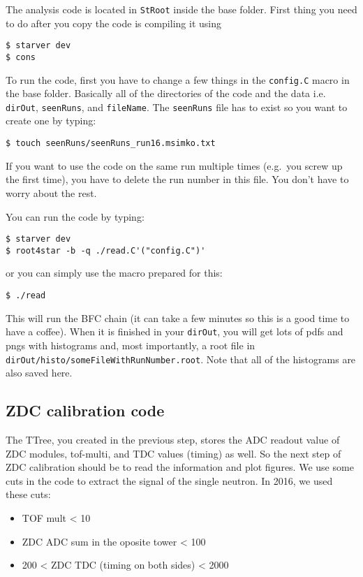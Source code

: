The analysis code is located in \texttt{StRoot} inside the base folder. First thing you need to do after you
copy the code is compiling it using
\begin{verbatim}
$ starver dev
$ cons
\end{verbatim}
To run the code, first you have to change a few things in the \texttt{config.C} macro in the base folder. 
Basically all of the
directories of the code and the data i.e. \texttt{dirOut}, \texttt{seenRuns}, and \texttt{fileName}. 
The \texttt{seenRuns} file has to
exist so you want to create one by typing:
\begin{verbatim}
$ touch seenRuns/seenRuns_run16.msimko.txt
\end{verbatim}
If you want to use the code
on the same run multiple times (e.g.\ you screw up the first time), you have to delete the run number in
this file. You don't have to worry
about the rest.

You can run the code by typing:
\begin{verbatim}
$ starver dev
$ root4star -b -q ./read.C'("config.C")'
\end{verbatim}
or you can simply use the macro prepared for this:
\begin{verbatim}
$ ./read
\end{verbatim}
This will run the BFC chain (it can take a few minutes so this is a good time to have a coffee). When it is finished
in your \texttt{dirOut}, you will get lots of pdfs and pngs with histograms and, most importantly, a root file in
\texttt{dirOut/histo/someFileWithRunNumber.root}. Note that all of the histograms are also saved here.

\subsection{ZDC calibration code}\hypertarget{zdc-calibration-code}{}\label{zdc-calibration-code}



The TTree, you created in the previous step, stores the ADC readout value of ZDC modules, tof-multi, and
TDC values (timing) as well. 
So the next step of ZDC calibration
should be to read the information and plot figures.
We use some cuts in the code to extract the signal of the single neutron. In 2016, we used these cuts:

\begin{itemize}
\item TOF mult \textless{} 10
\item ZDC ADC sum in the oposite tower \textless{} 100
\item 200 \textless{} ZDC TDC (timing on both sides) \textless{} 2000
\end{itemize}

